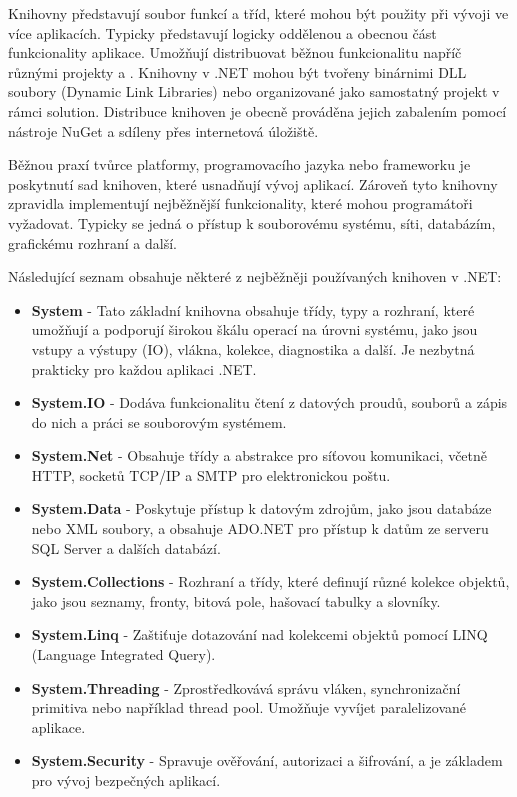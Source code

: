 
Knihovny představují soubor funkcí a tříd, které mohou být použity při vývoji ve více aplikacích. Typicky představují logicky oddělenou a obecnou část funkcionality aplikace. Umožňují distribuovat běžnou funkcionalitu napříč různými projekty a . Knihovny v .NET mohou být tvořeny binárnimi DLL soubory (Dynamic Link Libraries) nebo organizované jako samostatný projekt v rámci solution. Distribuce knihoven je obecně prováděna jejich zabalením pomocí nástroje NuGet a sdíleny přes internetová úložiště.

Běžnou praxí tvůrce platformy, programovacího jazyka nebo frameworku je poskytnutí sad knihoven, které usnadňují vývoj aplikací. Zároveň tyto knihovny zpravidla implementují nejběžnější funkcionality, které mohou programátoři vyžadovat. Typicky se jedná o přístup k souborovému systému, síti, databázím, grafickému rozhraní a další.

Následující seznam obsahuje některé z nejběžněji používaných knihoven v .NET:

\begin{itemize}
    \item \textbf{System} - Tato základní knihovna obsahuje třídy, typy a rozhraní, které umožňují a podporují širokou škálu operací na úrovni systému, jako jsou vstupy a výstupy (IO), vlákna, kolekce, diagnostika a další. Je nezbytná prakticky pro každou aplikaci .NET.
    \item \textbf{System.IO} - Dodáva funkcionalitu čtení z datových proudů, souborů a zápis do nich a práci se souborovým systémem.
    \item \textbf{System.Net} - Obsahuje třídy a abstrakce pro síťovou komunikaci, včetně HTTP, socketů TCP/IP a SMTP pro elektronickou poštu.
    \item \textbf{System.Data} - Poskytuje přístup k datovým zdrojům, jako jsou databáze nebo XML soubory, a obsahuje ADO.NET pro přístup k datům ze serveru SQL Server a dalších databází.
    \item \textbf{System.Collections} - Rozhraní a třídy, které definují různé kolekce objektů, jako jsou seznamy, fronty, bitová pole, hašovací tabulky a slovníky.
    \item \textbf{System.Linq} - Zaštiťuje dotazování nad kolekcemi objektů pomocí LINQ (Language Integrated Query).
    \item \textbf{System.Threading} - Zprostředkovává správu vláken, synchronizační primitiva nebo například thread pool. Umožňuje vyvíjet paralelizované aplikace.
    \item \textbf{System.Security} - Spravuje ověřování, autorizaci a šifrování, a je základem pro vývoj bezpečných aplikací.
\end{itemize}

